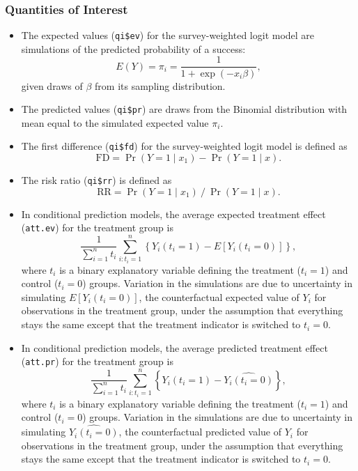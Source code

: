 \subsubsection{Quantities of Interest}
\begin{itemize}
\item The expected values ({\tt qi\$ev}) for the survey-weighted logit model are
  simulations of the predicted probability of a success: $$E(Y) =
  \pi_i= \frac{1}{1 + \exp(-x_i \beta)},$$ given draws of $\beta$ from
  its sampling distribution.

\item The predicted values ({\tt qi\$pr}) are draws from the Binomial
  distribution with mean equal to the simulated expected value $\pi_i$.  

\item The first difference ({\tt qi\$fd}) for the survey-weighted logit model is defined as
\begin{equation*}
\textrm{FD} = \Pr(Y = 1 \mid x_1) - \Pr(Y = 1 \mid x).
\end{equation*}

\item The risk ratio ({\tt qi\$rr}) is defined as
\begin{equation*}
\textrm{RR} = \Pr(Y = 1 \mid x_1) \ / \ \Pr(Y = 1 \mid x).
\end{equation*}

\item In conditional prediction models, the average expected treatment
  effect ({\tt att.ev}) for the treatment group is 
    \begin{equation*} \frac{1}{\sum_{i=1}^n t_i}\sum_{i:t_i=1}^n \left\{ Y_i(t_i=1) -
      E[Y_i(t_i=0)] \right\},
    \end{equation*} 
    where $t_i$ is a binary explanatory variable defining the treatment
    ($t_i=1$) and control ($t_i=0$) groups.  Variation in the
    simulations are due to uncertainty in simulating $E[Y_i(t_i=0)]$,
    the counterfactual expected value of $Y_i$ for observations in the
    treatment group, under the assumption that everything stays the
    same except that the treatment indicator is switched to $t_i=0$.

\item In conditional prediction models, the average predicted treatment
  effect ({\tt att.pr}) for the treatment group is 
    \begin{equation*} \frac{1}{\sum_{i=1}^n t_i}\sum_{i:t_i=1}^n \left\{ Y_i(t_i=1) -
      \widehat{Y_i(t_i=0)}\right\},
    \end{equation*} 
    where $t_i$ is a binary explanatory variable defining the
    treatment ($t_i=1$) and control ($t_i=0$) groups.  Variation in
    the simulations are due to uncertainty in simulating
    $\widehat{Y_i(t_i=0)}$, the counterfactual predicted value of
    $Y_i$ for observations in the treatment group, under the
    assumption that everything stays the same except that the
    treatment indicator is switched to $t_i=0$.
\end{itemize}

